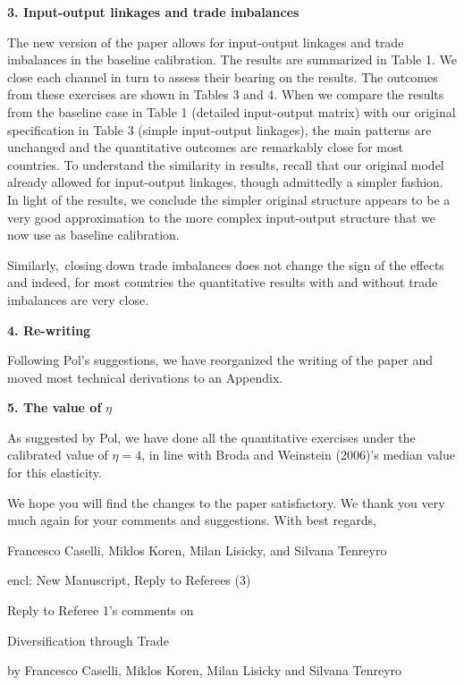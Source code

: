 \documentclass[12pt]{article}
\begin{document}
\bigskip

\textbf{3. Input-output linkages and trade imbalances}

The new version of the paper allows for input-output linkages and trade
imbalances in the baseline calibration. The results are summarized in Table
1. We close each channel in turn to assess their bearing on the results. The
outcomes from these exercises are shown in Tables 3 and 4. When we compare
the results from the baseline case in Table 1 (detailed input-output matrix)
with our original specification in Table 3 (simple input-output linkages),
the main patterns are unchanged and the quantitative outcomes are remarkably
close for most countries. To understand the similarity in results, recall
that our original model already allowed for input-output linkages, though
admittedly a simpler fashion. In light of the results, we conclude the
simpler original structure appears to be a very good approximation to the
more complex input-output structure that we now use as baseline calibration.

Similarly,\ closing down trade imbalances does not change the sign of the
effects and indeed, for most countries the quantitative results with and
without trade imbalances are very close.\bigskip

\textbf{4. Re-writing}

\bigskip Following Pol's suggestions, we have reorganized the writing of the
paper and moved most technical derivations to an Appendix.

\textbf{5. The value of }$\eta $\textbf{\ }

As suggested by Pol, we have done all the quantitative exercises under the
calibrated value of $\eta =4$, in line with Broda and Weinstein (2006)'s
median value for this elasticity.\bigskip

We hope you will find the changes to the paper satisfactory. We thank you
very much again for your comments and suggestions. With best regards,\bigskip

Francesco Caselli, Miklos Koren, Milan Lisicky, and Silvana Tenreyro

encl: New Manuscript, Reply to Referees (3)

\begin{center}
\pagebreak

\thispagestyle{plain}\setcounter{page}{1}Reply to Referee 1's comments on

{\Large Diversification through Trade}

by Francesco Caselli, Miklos Koren, Milan Lisicky and Silvana
Tenreyro\medskip

\bigskip \bigskip
\end{center}
\end{document}
